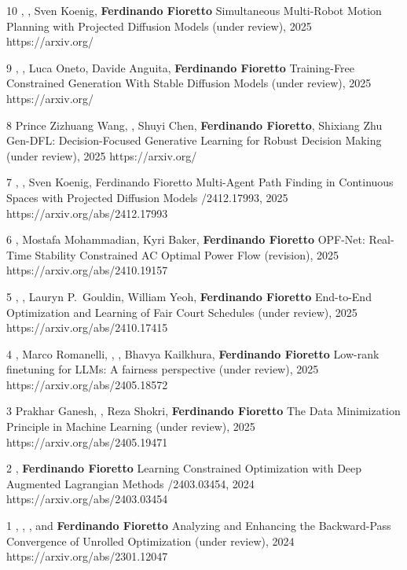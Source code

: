 \begin{pubs}
	
\wsentry
	{10}
	{, , Sven Koenig, {\bf Ferdinando Fioretto}}
	{Simultaneous Multi-Robot Motion Planning with Projected Diffusion Models}
	{ (under review), 2025}
	{https://arxiv.org/}

\wsentry
	{9}
	{, , Luca Oneto, Davide Anguita, {\bf Ferdinando Fioretto}}
	{Training-Free Constrained Generation With Stable Diffusion Models}
	{ (under review), 2025}
	{https://arxiv.org/}

\wsentry
	{8}
	{Prince Zizhuang Wang, , Shuyi Chen, {\bf Ferdinando Fioretto}, Shixiang Zhu}
	{Gen-DFL: Decision-Focused Generative Learning for Robust Decision Making}
	{ (under review), 2025}
	{https://arxiv.org/}


\wsentry
	{7}
	{, , Sven Koenig, Ferdinando Fioretto} 
	{Multi-Agent Path Finding in Continuous Spaces with Projected Diffusion Models}
	{/2412.17993, 2025}
	{https://arxiv.org/abs/2412.17993}

\wsentry
	{6}
	{, Mostafa Mohammadian, Kyri Baker, {\bf Ferdinando Fioretto}}
	{OPF-Net: Real-Time Stability Constrained AC Optimal Power Flow}
	{ (revision), 2025}
	{https://arxiv.org/abs/2410.19157}

\wsentry
	{5}
	{, , Lauryn P.~Gouldin, William Yeoh, {\bf Ferdinando Fioretto}}
	{End-to-End Optimization and Learning of Fair Court Schedules}
	{ (under review), 2025}
	{https://arxiv.org/abs/2410.17415}

\wsentry
	{4}
	{,  Marco Romanelli, , , 
	Bhavya Kailkhura, {\bf Ferdinando Fioretto}}
	{Low-rank finetuning for LLMs: A fairness perspective}
	{ (under review), 2025}
	{https://arxiv.org/abs/2405.18572}

\wsentry
	{3}
	{Prakhar Ganesh, , Reza Shokri, {\bf Ferdinando Fioretto}}
	{The Data Minimization Principle in Machine Learning}
	{ (under review), 2025}
	{https://arxiv.org/abs/2405.19471}

\wsentry
	{2}
	{, {\bf Ferdinando Fioretto}}
	{Learning Constrained Optimization with Deep Augmented Lagrangian Methods}
	{/2403.03454, 2024}
	{https://arxiv.org/abs/2403.03454}

\wsentry
	{1}
	{, , ,
	and {\bf Ferdinando Fioretto}}
	{Analyzing and Enhancing the Backward-Pass Convergence of Unrolled Optimization}	
	{ (under review), 2024}
	{https://arxiv.org/abs/2301.12047}

\end{pubs}


